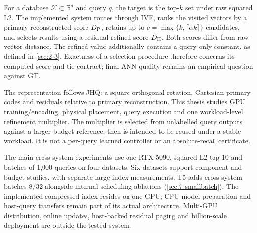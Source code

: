 For a database $\mathcal X\subset\mathbb R^d$ and query $q$, the target is
the top-$k$ set under raw squared L2. The implemented system routes through
IVF, ranks the visited vectors by a primary reconstructed score
$D_{\mathrm{P}}$, retains up to $c=\max\{k,\lceil\alpha k\rceil\}$ candidates,
and selects results using a residual-refined score $D_{\mathrm{H}}$.
Both scores differ from raw-vector distance. The refined value additionally
contains a query-only constant, as defined in \cref{sec:2-3}.
Exactness of a selection procedure therefore concerns its computed score
and tie contract; final ANN quality remains an empirical question against GT.

The representation follows JHQ: a square orthogonal rotation, Cartesian
primary codes and residuals relative to primary reconstruction. This thesis
studies GPU training/encoding, physical placement, query execution and one
workload-level refinement multiplier. The multiplier is selected from
unlabelled query outputs against a larger-budget reference, then is intended
to be reused under a stable workload. It is not a per-query learned controller
or an absolute-recall certificate.

The main cross-system experiments use one RTX 5090, squared-L2 top-10 and
batches of 1,000 queries on four datasets. Six datasets support component
and budget studies, with separate large-index measurements. T5 adds
cross-system batches 8/32 alongside internal scheduling ablations
(\cref{sec:7-smallbatch}). The implemented compressed index
resides on one GPU; CPU model preparation and host-query transfers remain
part of its actual architecture. Multi-GPU distribution, online updates,
host-backed residual paging and billion-scale deployment are outside the
tested system.

